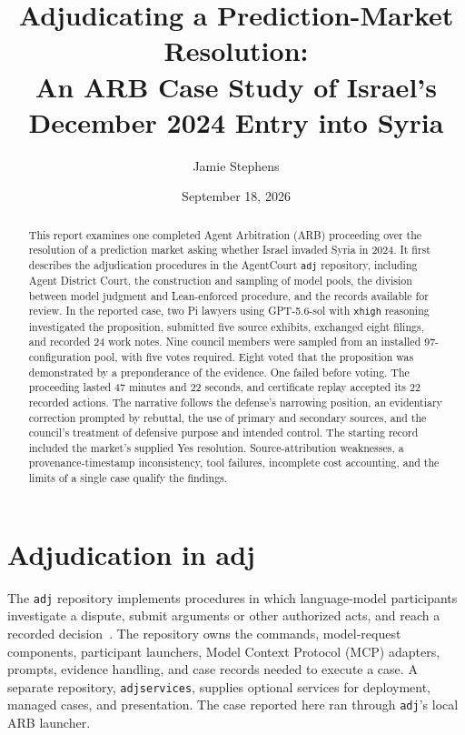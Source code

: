\documentclass[11pt]{article}
\title{Adjudicating a Prediction-Market Resolution:\\An ARB Case Study of Israel's December 2024 Entry into Syria}
\author{Jamie Stephens}
\date{September 18, 2026}
\newcommand{\code}[1]{\texttt{#1}}
\begin{document}
\maketitle

\begin{abstract}
This report examines one completed Agent Arbitration (ARB) proceeding over the resolution of a prediction market asking whether Israel invaded Syria in 2024.  It first describes the adjudication procedures in the AgentCourt \code{adj} repository, including Agent District Court, the construction and sampling of model pools, the division between model judgment and Lean-enforced procedure, and the records available for review.  In the reported case, two Pi lawyers using GPT-5.6-sol with \code{xhigh} reasoning investigated the proposition, submitted five source exhibits, exchanged eight filings, and recorded 24 work notes.  Nine council members were sampled from an installed 97-configuration pool, with five votes required.  Eight voted that the proposition was demonstrated by a preponderance of the evidence.  One failed before voting.  The proceeding lasted 47 minutes and 22 seconds, and certificate replay accepted its 22 recorded actions.  The narrative follows the defense's narrowing position, an evidentiary correction prompted by rebuttal, the use of primary and secondary sources, and the council's treatment of defensive purpose and intended control.  The starting record included the market's supplied Yes resolution.  Source-attribution weaknesses, a provenance-timestamp inconsistency, tool failures, incomplete cost accounting, and the limits of a single case qualify the findings.
\end{abstract}

\section{Adjudication in adj}
\label{sec:system}

The \code{adj} repository implements procedures in which language-model participants investigate a dispute, submit arguments or other authorized acts, and reach a recorded decision~\cite{adjrepo,procedures}.  The repository owns the commands, model-request components, participant launchers, Model Context Protocol (MCP) adapters, prompts, evidence handling, and case records needed to execute a case.  A separate repository, \code{adjservices}, supplies optional services for deployment, managed cases, and presentation.  The case reported here ran through \code{adj}'s local ARB launcher.
\end{document}
